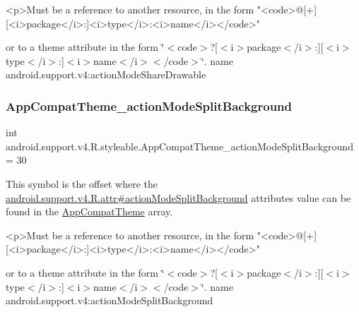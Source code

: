 \begin{DoxyVerb}      <p>Must be a reference to another resource, in the form "<code>@[+][<i>package</i>:]<i>type</i>:<i>name</i></code>"
\end{DoxyVerb}
 or to a theme attribute in the form \char`\"{}$<$code$>$?\mbox{[}$<$i$>$package$<$/i$>$\+:\mbox{]}\mbox{[}$<$i$>$type$<$/i$>$\+:\mbox{]}$<$i$>$name$<$/i$>$$<$/code$>$\char`\"{}.  name android.\+support.\+v4\+:action\+Mode\+Share\+Drawable \mbox{\label{classandroid_1_1support_1_1v4_1_1R_1_1styleable_a3a8c8ba4a4bb7a3e1cb7b23f47caa2b1}} 
\subsubsection{\texorpdfstring{App\+Compat\+Theme\+\_\+action\+Mode\+Split\+Background}{AppCompatTheme\_actionModeSplitBackground}}
{\footnotesize\ttfamily int android.\+support.\+v4.\+R.\+styleable.\+App\+Compat\+Theme\+\_\+action\+Mode\+Split\+Background = 30\hspace{0.3cm}{\ttfamily [static]}}

This symbol is the offset where the \hyperlink{classandroid_1_1support_1_1v4_1_1R_1_1attr_af329d9724510b9158c62da58f2adf444}{android.\+support.\+v4.\+R.\+attr\#action\+Mode\+Split\+Background} attribute\textquotesingle{}s value can be found in the \hyperlink{classandroid_1_1support_1_1v4_1_1R_1_1styleable_ac07ebbe62ed977f6dcaadc6397840ace}{App\+Compat\+Theme} array.

\begin{DoxyVerb}      <p>Must be a reference to another resource, in the form "<code>@[+][<i>package</i>:]<i>type</i>:<i>name</i></code>"
\end{DoxyVerb}
 or to a theme attribute in the form \char`\"{}$<$code$>$?\mbox{[}$<$i$>$package$<$/i$>$\+:\mbox{]}\mbox{[}$<$i$>$type$<$/i$>$\+:\mbox{]}$<$i$>$name$<$/i$>$$<$/code$>$\char`\"{}.  name android.\+support.\+v4\+:action\+Mode\+Split\+Background \mbox{\label{classandroid_1_1support_1_1v4_1_1R_1_1styleable_a971a9ca17c81aa97a72178cc5f548ec6}} 
